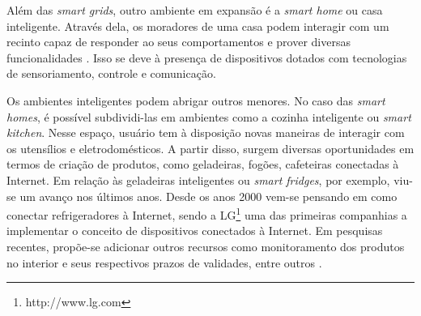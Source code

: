 Além das \textit{smart grids}, outro ambiente em expansão é a \textit{smart home} ou casa inteligente. Através dela, os moradores de uma casa podem interagir com um recinto capaz de responder ao seus comportamentos e prover diversas funcionalidades \cite{DeSilva2012}. Isso se deve à presença de dispositivos dotados com tecnologias de sensoriamento, controle e comunicação. 

Os ambientes inteligentes podem abrigar outros menores. No caso das \textit{smart homes}, é possível subdividi-las em ambientes como a cozinha inteligente ou \textit{smart kitchen}. Nesse espaço, usuário tem à disposição novas maneiras de interagir com os utensílios e eletrodomésticos. A partir disso, surgem diversas oportunidades em termos de criação de produtos, como geladeiras, fogões, cafeteiras conectadas à Internet. Em relação às geladeiras inteligentes ou \textit{smart fridges}, por exemplo, viu-se um avanço nos últimos anos. Desde os anos 2000 vem-se pensando em como conectar refrigeradores à Internet, sendo a LG\textsuperscript{\textregistered}\footnote{http://www.lg.com} uma das primeiras companhias a implementar o conceito de dispositivos conectados à Internet. Em pesquisas recentes, propõe-se adicionar outros recursos como monitoramento dos produtos no interior e seus respectivos prazos de validades, entre outros \cite{Hachani2016}. 

